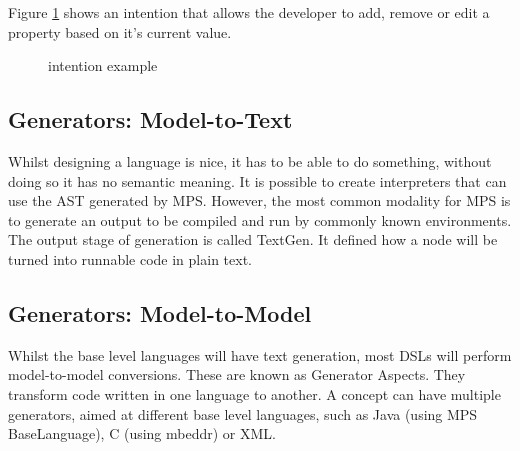 Figure \ref{fig:intention_example} shows an intention that allows the developer to add, remove or edit a property based on it's current value.
\begin{figure}[h]
    \centering
    \caption{intention example}
    \label{fig:intention_example}
\end{figure}

\subsection{Generators: Model-to-Text}
Whilst designing a language is nice, it has to be able to do something, without doing so it has no semantic meaning.
It is possible to create interpreters that can use the AST generated by MPS.
However, the most common modality for MPS is to generate an output to be compiled and run by commonly known environments.
The output stage of generation is called TextGen.
It defined how a node will be turned into runnable code in plain text.

\subsection{Generators: Model-to-Model}
Whilst the base level languages will have text generation, most DSLs will perform model-to-model conversions.
These are known as Generator Aspects.
They transform code written in one language to another.
A concept can have multiple generators, aimed at different base level languages, such as Java (using MPS BaseLanguage), C (using mbeddr) or XML.


